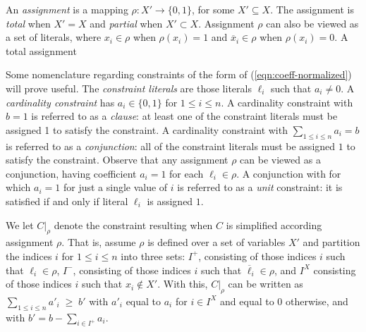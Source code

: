 \documentclass{easychair}
\renewcommand{\obar}[1]{\overline{#1}}
\newcommand{\lit}{\ell}
\newcommand{\assign}{\rho}
\newcommand{\simplify}[2]{#1|_{#2}}
\newcommand{\nassign}{\obar{\assign}}
\newcommand{\func}[1]{\llbracket#1\rrbracket}
\begin{document}
An {\em assignment} is a mapping $\assign : X' \rightarrow \{0,1\}$,
for some $X' \subseteq X$.  The assignment is {\em total} when $X' =
X$ and {\em partial} when $X' \subset X$.  Assignment $\assign$ can
also be viewed as a set of literals, where $x_i \in \assign$ when
$\assign(x_i) = 1$ and $\obar{x}_i \in \assign$ when $\assign(x_i) = 0$.
A total assignment 

Some nomenclature regarding constraints of the form of
(\ref{eqn:coeff-normalized}) will prove useful.  The {\em constraint
  literals} are those literals $\lit_i$ such that $a_i \not = 0$.  A
{\em cardinality constraint} has $a_i \in \{0,1\}$ for $1 \leq i \leq
n$.  A cardinality constraint with $b=1$ is referred to as a {\em
  clause}: at least one of the constraint literals must be assigned 1
to satisfy the constraint.  A cardinality constraint with $\sum_{1\leq
  i\leq n} a_i = b$ is referred to as a {\em conjunction}: all of the
constraint literals must be assigned $1$ to satisfy the constraint.
Observe that any assignment $\assign$ can be viewed as a conjunction,
having coefficient $a_i = 1$ for each $\lit_i \in \assign$.  A
conjunction with for which $a_i = 1$ for just a single value of $i$ is
referred to as a {\em unit} constraint: it is satisfied if and only if
literal $\lit_i$ is assigned $1$.




We let $\simplify{C}{\assign}$ denote the constraint resulting when $C$ is
simplified according assignment $\assign$.  That is, assume $\assign$ is defined over a set of variables $X'$ and
partition the indices $i$ for $1 \leq i \leq n$ into
three sets:
$I^{+}$, consisting of those indices $i$ such that $\lit_{i} \in \assign$,
$I^{-}$, consisting of those indices $i$ such that $\obar{\lit}_{i} \in \assign$,
and $I^{X}$ consisting of those indices $i$ such that $x_i \not \in X'$.
With this, $\simplify{C}{\assign}$ can be written as $\sum_{1 \leq i \leq n} a'_i \; \geq \; b'$
with $a'_i$ equal to $a_i$ for $i \in I^{X}$ and equal to $0$ otherwise, and with $b' = b - \sum_{i\in I^{+}} a_i$.
\end{document}
